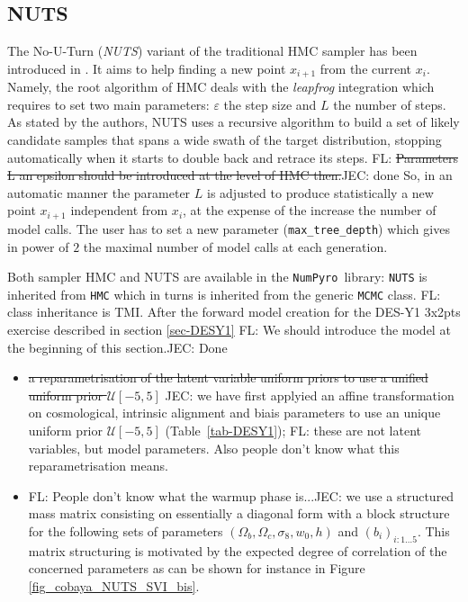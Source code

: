 \documentclass[twocolumn,twocolappendix,nofootinbib,iop]{openjournal}
\newcommand{\FrL}[1]{{\color{cyan}FL: #1}}
\newcommand{\JEC}[1]{{\color{magenta}JEC: #1}}
\newcommand{\numpyro}{\texttt{NumPyro}}
\begin{document}
\subsection{NUTS}
\label{sec-NUTS}
%

The No-U-Turn (\textit{NUTS})  variant of the traditional HMC sampler has been introduced in \citet{10.5555/2627435.2638586}. It aims to help finding a new point  $x_{i+1}$ from  the current $x_i$. Namely, the root algorithm of HMC deals with the \textit{leapfrog} integration which requires to set two main parameters: $\varepsilon$ the step size and $L$ the number of steps. As stated by the authors, NUTS  uses a recursive algorithm to build a set of likely candidate samples that spans a wide swath of the target distribution, stopping automatically when it starts to double back and retrace its steps. \FrL{\st{Parameters L an epsilon should be introduced at the level of HMC then.}}\JEC{done} So, in an automatic manner the parameter $L$ is adjusted to produce statistically  a new point $x_{i+1}$ independent from $x_i$, at the expense of the increase the number of model calls. The user has to set a new  parameter  (\texttt{max\_tree\_depth}) which gives in power of $2$ the maximal number of model calls at each generation.

Both sampler HMC and NUTS are available in the \numpyro\ library: \texttt{NUTS} is inherited from \texttt{HMC} which in turns is inherited from the generic \texttt{MCMC} class. \FrL{class inheritance is TMI.}  After the forward model creation for the DES-Y1 3x2pts exercise described in section \ref{sec-DESY1} \FrL{We should introduce the model at the beginning of this section.}\JEC{Done}
\begin{itemize}
    \item \st{a reparametrisation of the latent variable uniform priors to use a unified uniform prior $\mathcal{U}[-5,5]$} \JEC{we have first applyied  an affine transformation on cosmological, intrinsic alignment and biais parameters to use an unique uniform prior $\mathcal{U}[-5,5]$ (Table~\ref{tab-DESY1})}; \FrL{these are not latent variables, but model parameters. Also people don't know what this reparametrisation means.}
    \item  \FrL{People don't know what the warmup phase is...}\JEC{we use a structured mass matrix consisting on essentially a diagonal form  with a block structure for the following sets of parameters} $(\Omega_b,\Omega_c,\sigma_8,w_0,h)$ and $(b_i)_{i:1\dots5}$. This matrix structuring is motivated by the expected degree of correlation of the concerned parameters as can be shown for instance in Figure \ref{fig_cobaya_NUTS_SVI_bis}.
\end{itemize}
\end{document}
